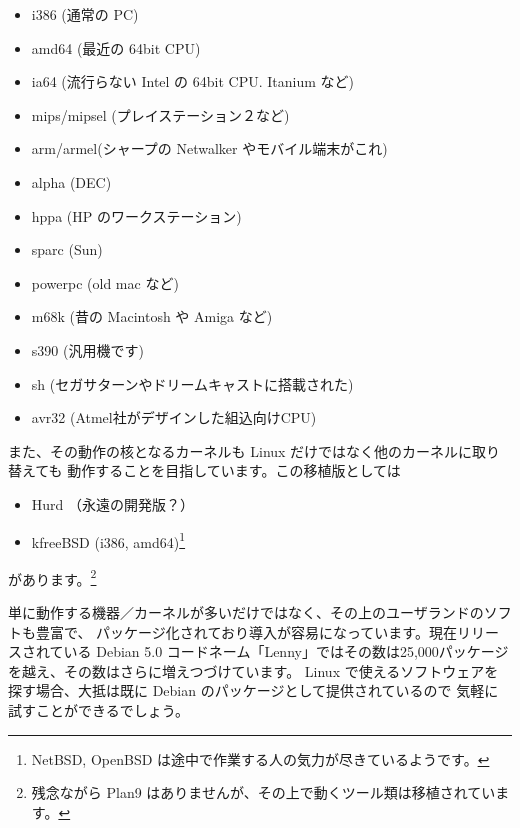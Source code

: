 \documentclass[mingoth,a4paper]{jsarticle}
\begin{document}
\vspace{1em}
\begin{minipage}[t]{0.58\hsize}
    \begin{itemize}
          \item i386	(通常の PC)
          \item amd64	(最近の 64bit CPU)
          \item ia64	(流行らない Intel の 64bit CPU. Itanium など)
          \item mips/mipsel (プレイステーション２など)
          \item arm/armel(シャープの Netwalker やモバイル端末がこれ)
          \item alpha    (DEC)
    \end{itemize}
\end{minipage}
\begin{minipage}[t]{0.415\hsize}
    \begin{itemize}
          \item hppa	(HP のワークステーション)
          \item sparc	(Sun)
          \item powerpc  (old mac など)
          \item m68k	(昔の Macintosh や Amiga など)
          \item s390 	(汎用機です)
          \item sh	(セガサターンやドリームキャストに搭載された)
          \item avr32   (Atmel社がデザインした組込向けCPU)
    \end{itemize}
\end{minipage}

\vspace{1em}
また、その動作の核となるカーネルも Linux だけではなく他のカーネルに取り替えても
動作することを目指しています。この移植版としては
%
\begin{itemize}
 \item Hurd	（永遠の開発版？）
 \item kfreeBSD (i386, amd64)\footnote{NetBSD, OpenBSD は途中で作業する人の気力が尽きているようです。}
\end{itemize}

があります。\footnote{残念ながら Plan9 はありませんが、その上で動くツール類は移植されています。}

単に動作する機器／カーネルが多いだけではなく、その上のユーザランドのソフトも豊富で、
パッケージ化されており導入が容易になっています。現在リリースされている Debian 5.0 
コードネーム「Lenny」ではその数は25,000パッケージを越え、その数はさらに増えつづけています。
Linux で使えるソフトウェアを探す場合、大抵は既に Debian のパッケージとして提供されているので
気軽に試すことができるでしょう。
\end{document}
